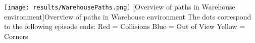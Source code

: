 \begin{SCfigure}
    \centering
    \texttt{[image: results/WarehousePaths.png]}
    [Overview of paths in Warehouse environment]{Overview of paths in Warehouse environment\newline\newline\newline\newline\newline\newline\newline\newline\newline\newline\newline\newline\newline\newline\newline\newline\newline\newline
    The dots correspond to the following episode ends: \newline
    Red = Collisions\newline
    Blue = Out of View \newline
    Yellow = Corners}
    \label{im:FactoryPaths}
\end{SCfigure}



